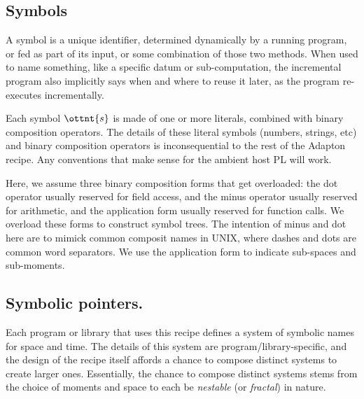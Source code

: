 \documentclass[11pt]{article}
\begin{document}
\subsection{Symbols}
\label{sec:symbols}

A symbol is a
unique identifier, determined dynamically by a running program, or fed
as part of its input, or some combination of those two methods.
%
When used to name something, like a specific datum or sub-computation,
the incremental program also implicitly says when and where to reuse
it later, as the program re-executes incrementally.

\ottgrammartabular{
  \otts
}

Each symbol $\ottnt{s}$ is made of one or more literals,
combined with binary composition operators.
%
The details of these literal symbols (numbers, strings, etc) and
binary composition operators is inconsequential to the rest of the
Adapton recipe.  Any conventions that make sense for the ambient host PL will work.

Here, we assume three binary composition forms that get overloaded: the
dot operator usually reserved for field access, and the minus operator
usually reserved for arithmetic, and the application form usually reserved for function calls.
%
We overload these forms to construct symbol trees.
%
The intention of minus and dot here are to mimick common composit
names in UNIX, where dashes and dots are common word separators.
%
We use the application form to indicate sub-spaces and sub-moments.

\subsection{Symbolic pointers.}
\label{sec:symbolic-pointers}

Each program or library that uses this recipe
defines a system of symbolic names for space and time.
The details of this system are program/library-specific, and the
design of the recipe itself affords a chance to compose distinct systems to
create larger ones.
Essentially, the chance to compose distinct systems stems from the choice of moments
and space to each be \emph{nestable} (or \emph{fractal}) in nature.

\nolinenumbers
\ottgrammartabular{
  {\makeLineNumber\stepLineNumber} \ottSpace
  \\
   {\makeLineNumber\stepLineNumber} \ottMoment
  \\
   {\makeLineNumber\stepLineNumber} \ottp
  \\
   {\makeLineNumber\stepLineNumber} \ottpp
  \\
  {\makeLineNumber\stepLineNumber} \ottd
}
\linenumbers
\end{document}

